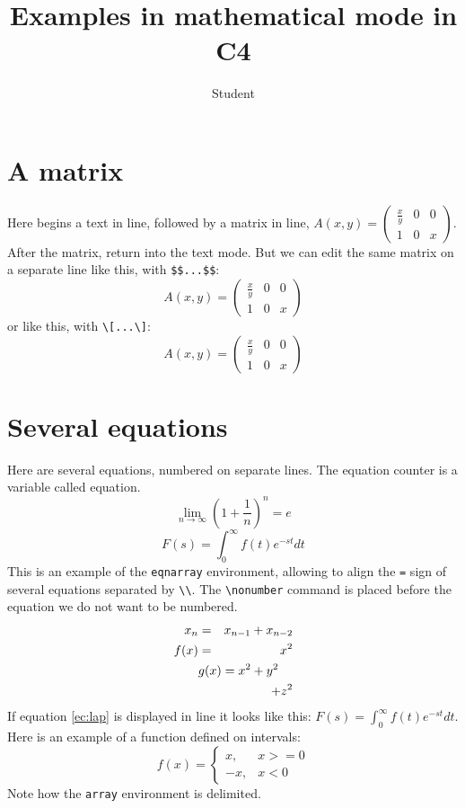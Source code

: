 \documentclass{article}
\title{Examples in mathematical mode in C4}
\author{Student}
\begin{document}
\maketitle
\section{A matrix}
Here begins a text in line, followed by a matrix in line,  
$A(x,y)=\left(
\begin{array}{ccc}
\frac{x}{y} & 0 & 0\\
1 & 0 & x
\end{array}
\right)$. After the matrix,  return into the text mode. But we can edit the same matrix on a separate line like this, with \verb+$$...$$+:
$$A(x,y)=\left(
\begin{array}{ccc}
\frac{x}{y} & 0 & 0\\
1 & 0 & x
\end{array}
\right)$$ or like this, with \verb+\[...\]+:
\[A(x,y)=\left(
\begin{array}{ccc}
\frac{x}{y} & 0 & 0\\
1 & 0 & x
\end{array}
\right)\]
\section{Several equations}
Here are several equations, numbered on separate lines. The equation counter is a variable called equation.
\begin{equation}\label{ec:e}
\lim_{n\rightarrow\infty}\left(1+\frac{1}{n}\right)^{n}=e
\end{equation}
\begin{equation}\label{ec:lap}
F(s)=\int_{0}^{\infty}f(t)e^{-st}dt
\end{equation}
This is an example of the \verb+eqnarray+ environment, allowing to align the \verb+=+ sign of several equations separated by \verb+\\+. The \verb+\nonumber+ command is placed before the equation we do not want to be numbered.
\begin{eqnarray}
x_n&=&x_{n-1}+x_{n-2}\\
\nonumber
f(x)&=&x^2\\
\nonumber
\lefteqn{g(x)=x^2+y^2}\\
& &+z^2
\end{eqnarray}
If equation \ref{ec:lap} is displayed in line it looks like this: $F(s)=\int_{0}^{\infty}f(t)e^{-st}dt$.
Here is an example of a function defined on intervals:
\begin{equation}
f(x)=\left\{
\begin{array}{ll}
x,&x>=0\\
-x,&x<0
\end{array}\right.
\end{equation}
Note how the \verb+array+ environment is delimited.
\end{document}
